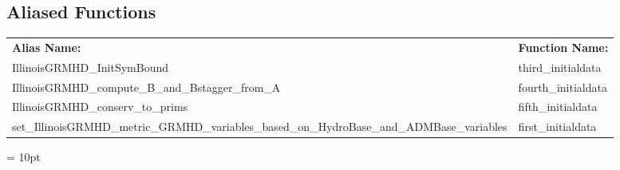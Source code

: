 \documentclass{article}
\begin{document}
\subsection*{Aliased Functions}

\hspace{5mm}

 \begin{tabular*}{160mm}{ll} 

{\bf Alias Name:} ~~~~~~~ & {\bf Function Name:} \\ 
IllinoisGRMHD\_InitSymBound & third\_initialdata \\ 
IllinoisGRMHD\_compute\_B\_and\_Bstagger\_from\_A & fourth\_initialdata \\ 
IllinoisGRMHD\_conserv\_to\_prims & fifth\_initialdata \\ 
set\_IllinoisGRMHD\_metric\_GRMHD\_variables\_based\_on\_HydroBase\_and\_ADMBase\_variables & first\_initialdata \\ 
\end{tabular*} 



\vspace{5mm}\parskip = 10pt 
\end{document}
